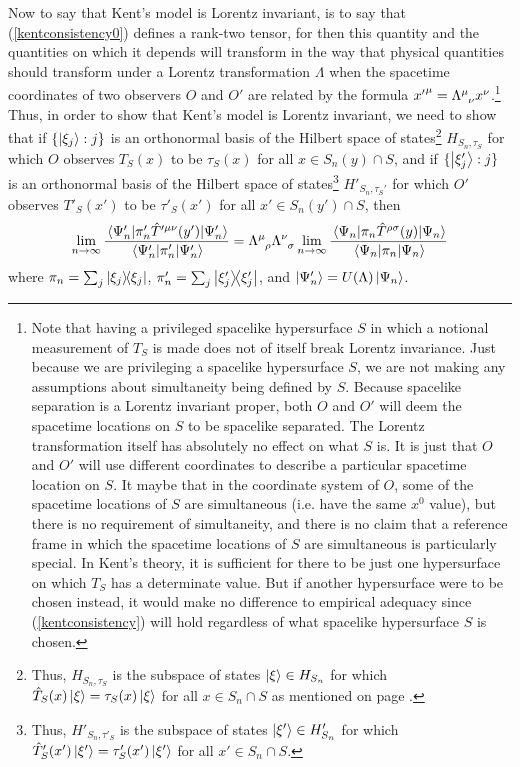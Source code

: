 Now to say that Kent's model is Lorentz invariant, is to say that (\ref{kentconsistency0}) defines a rank-two tensor, for then this quantity and the quantities on which it depends will transform in the way that physical quantities should transform under a Lorentz transformation $\Lambda$ when the spacetime coordinates of two observers $O$ and $O'$ are related by the formula ${x'}^\mu=\Lambda\indices{^\mu_\nu}x^\nu$.\footnote{Note that having a privileged spacelike hypersurface $S$ in which a notional measurement of $T_S$ is made does not of itself break Lorentz invariance. Just because we are privileging a spacelike hypersurface $S$, we are not making any assumptions about simultaneity being defined by $S$. Because spacelike separation is a Lorentz invariant proper, both $O$ and $O'$ will deem the spacetime locations on $S$ to be spacelike separated. The Lorentz transformation itself has absolutely no effect on what $S$ is. It is just that $O$ and $O'$ will use different coordinates to describe a particular spacetime location on $S$. It maybe that in the coordinate system of $O$, some of the spacetime locations of $S$ are simultaneous (i.e. have the same $x^0$ value), but there is no requirement of simultaneity, and there is no claim that a reference frame in which the spacetime locations of $S$ are simultaneous is particularly special. In Kent's theory, it is sufficient for there to be just one hypersurface on which  $T_S$ has a determinate value. But if another hypersurface were to be chosen instead, it would make no difference to empirical adequacy since (\ref{kentconsistency}) will hold regardless of what spacelike hypersurface $S$ is chosen.} Thus, in order to show that Kent's model is Lorentz invariant, we need to show that if $\{\ket{\xi_j}:j\}$ is an orthonormal basis of the Hilbert space of states\footnote{Thus, $H_{S_n,\tau_S}$ is the subspace of states $\ket{\xi}\in H_{S_n}$ for which  $\hat{T}_S(x)\ket{\xi}=\tau_S(x)\ket{\xi}$  for all $x\in S_n\cap S$ as mentioned on page \pageref{HStau}.} $H_{S_n,\tau_S}$ for which $O$ observes $T_S(x)$ to be $\tau_S(x)$ for all $x\in S_n(y)\cap S$, and if $\{\ket{\xi_j'}:j\}$ is an orthonormal basis of the Hilbert space of states\footnote{Thus,  $H'_{S_n,\tau'_S}$ is the subspace of states $\ket{\xi'}\in H'_{S_n}$ for which  $\hat{T}'_S(x')\ket{\xi'}=\tau'_S(x')\ket{\xi'}$  for all $x'\in S_n\cap S$. } $H'_{S_n,\tau_S'}$ for which $O'$ observes $T'_S(x')$ to be $\tau'_S(x')$ for all $x'\in S_n(y')\cap S$, then
\begin{equation}\label{kentlorentz}
\lim_{n\rightarrow\infty}\frac{\ev{\pi_n'\hat{T}^{\prime\mu\nu}(y')}{\Psi_n'}}{\ev{\pi_n'}{\Psi_n'}}=\Lambda\indices{^\mu_\rho}\Lambda\indices{^\nu_\sigma} \lim_{n\rightarrow\infty}\frac{\ev{\pi_n\hat{T}^{\rho\sigma}(y)}{\Psi_n}}{\ev{\pi_n}{\Psi_n}}
\end{equation}
where $\pi_n=\sum_j\dyad{\xi_j}$, $\pi_n'=\sum_j\dyad{\xi_j'}$, and $\ket{\Psi_n'}=U(\Lambda)\ket{\Psi_n}$. 


